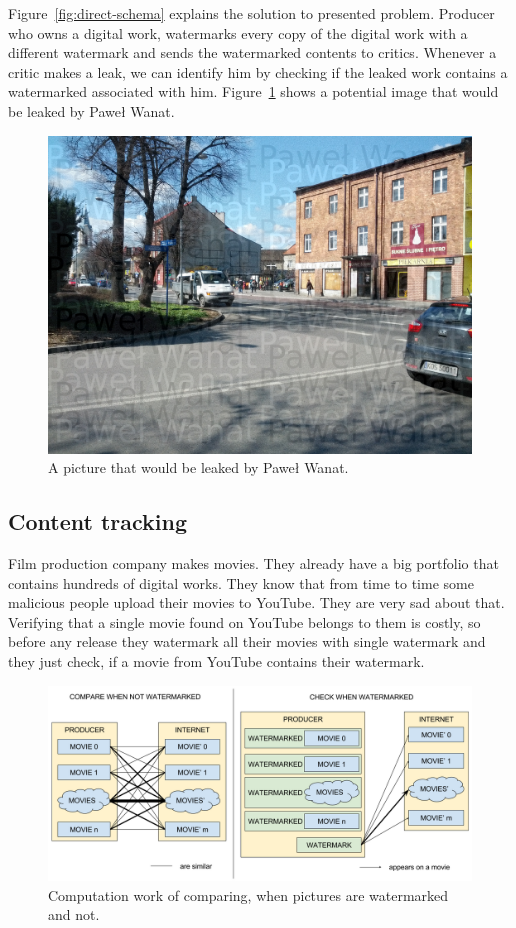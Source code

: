 \documentclass[a4paper,12pt]{article}
\begin{document}
Figure~\ref{fig:direct-schema} explains the solution to presented problem.
Producer who owns a digital work, watermarks every copy of the digital work with
a different watermark and sends the watermarked contents to critics. Whenever
a critic makes a leak, we can identify him by checking if the leaked work
contains a watermarked associated with him. Figure~\ref{fig:direct-leak-ex}
shows a potential image that would be leaked by Paweł Wanat.

\begin{figure}[ht]
  \centering
    \includegraphics[width=1.0\textwidth]{../../images/example-critic.jpg}
  \caption{A picture that would be leaked by Paweł Wanat.}
  \label{fig:direct-leak-ex}
\end{figure}

\subsection*{Content tracking}

Film production company makes movies. They already have a big portfolio that
contains hundreds of digital works. They know that from time to time some
malicious people upload their movies to YouTube. They are very sad about that.
Verifying that a single movie found on YouTube belongs to them is costly,
so before any release they watermark all their movies with single watermark and
they just check, if a movie from YouTube contains their watermark.
\begin{figure}[ht]
  \centering
    \includegraphics[width=1.0\textwidth]{../../images/watermark-tracking.png}
  \caption{Computation work of comparing, when pictures are watermarked and not.}
  \label{fig:tracking-schema}
\end{figure}
\end{document}
